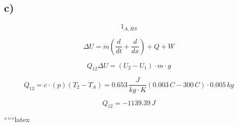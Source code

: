 

\subsection*{c)}
\begin{equation*}
1_{A,HS}
\end{equation*}

\begin{equation*}
\Delta U = \dot{m} \left( \frac{d}{dt} + \frac{d}{dx} \right) + Q + W
\end{equation*}

\begin{equation*}
Q_{12} \Delta U = (U_2 - U_1) \cdot m \cdot g
\end{equation*}

\begin{equation*}
Q_{12} = c \cdot (p) \left( T_2 - T_A \right) = 0.653 \, \frac{J}{kg \cdot K} \left( 0.003 \, C - 300 \, C \right) \cdot 0.005 \, kg
\end{equation*}

\begin{equation*}
Q_{12} = -1139.39 \, J
\end{equation*}

``````latex